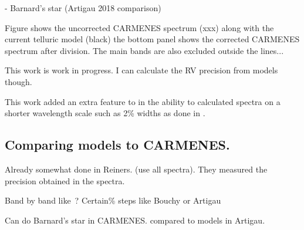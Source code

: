 - Barnard's star (Artigau 2018 comparison)

Figure \citep{} shows the uncorrected {CARMENES} spectrum (xxx) along with the current telluric model (black) the bottom panel shows the corrected {CARMENES} spectrum after division.
The main \nir{}  bands are also excluded outside the lines...


This work is work in progress.
{I can calculate the {RV} precision from models though.}




This work added an extra feature to \eniric{} in the ability to calculated spectra on a shorter wavelength scale such as 2\% widths as done in \citep{artigau_optical_2018}.


\subsection{Comparing models to {CARMENES}.}
Already somewhat done in Reiners.
(use all spectra).
They measured the precision obtained in the spectra.

Band by band like~\citet{figueira_radial_2016}?
Certain\% steps like Bouchy or Artigau


Can do Barnard's star in {CARMENES}.
 compared to models in Artigau.


%

%
%
